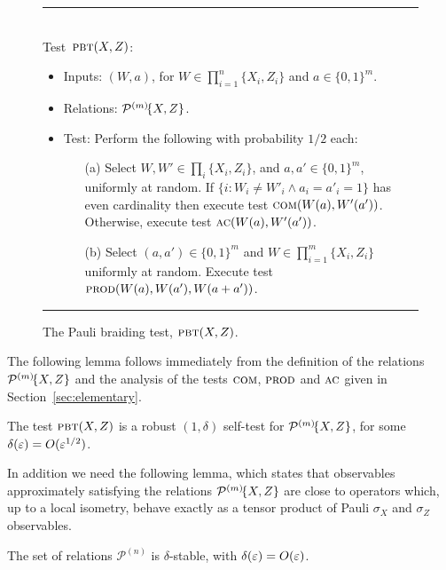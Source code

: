 \begin{figure}[H]
\rule[1ex]{16.5cm}{0.5pt}\\
\justifying
Test~$\textsc{pbt}(X,Z)$: %
\begin{itemize}
\item Inputs: $(W,a)$, for $W\in\prod_{i=1}^n\{X_i,Z_i\}$ and $a\in\{0,1\}^m$.
\item Relations: $\mathcal{P}^{(m)}\!\{X,Z\}$.  
\item Test: Perform the following with probability $1/2$ each: 
\begin{enumerate}
\item[(a)] Select $W,W'\in \prod_i \{X_i,Z_i\}$, and $a,a'\in\{0,1\}^m$, uniformly at random. If $\{i: W_i\neq W'_i \wedge a_i=a'_i=1\}$ has even cardinality then execute test $\textsc{com}(W(a),W'(a'))$. Otherwise, execute test $\textsc{ac}(W(a),W'(a'))$. 
\item[(b)] Select $(a,a')\in\{0,1\}^m$ and $W\in\prod_{i=1}^m\{X_i,Z_i\}$ uniformly at random. Execute test $\textsc{prod}(W(a),W(a'),W(a+a'))$. 
\end{enumerate}
\end{itemize}
\rule[2ex]{16.5cm}{0.5pt}\vspace{-.5cm}
\caption{The Pauli braiding test, $\textsc{pbt}(X,Z)$.}
\label{fig:pbt}
\end{figure}

The following lemma follows immediately from the definition of the relations  $\mathcal{P}^{(m)}\!\{X,Z\}$ and the analysis of the tests $\textsc{com}$, $\textsc{prod}$ and $\textsc{ac}$ given in Section~\ref{sec:elementary}. 


\begin{lemma}\label{lem:pbt}
The test $\textsc{pbt}(X,Z)$ is a robust $(1,\delta)$ self-test 
for $\mathcal{P}^{(m)}\!\{X,Z\}$, for some $\delta(\varepsilon) = O(\varepsilon^{1/2})$. 
\end{lemma}

In addition we need the following lemma, which states that observables approximately satisfying the relations $\mathcal{P}^{(m)}\!\{X,Z\}$ are close to operators which, up to a local isometry, behave exactly as a tensor product of Pauli $\sigma_X$ and $\sigma_Z$ observables. 


\begin{lemma}\label{lem:pauli-stable}
The set of relations $\mathcal{P}^{(n)}$ is $\delta$-stable, with $\delta(\varepsilon) = O(\varepsilon)$.
\end{lemma}

